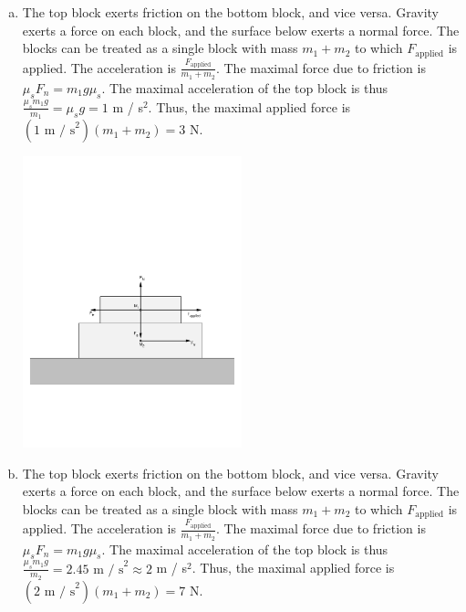 \documentclass{esg8012pset}
\begin{document}
\begin{solution}
  \begin{enumerate}[a)]
    \item The top block exerts friction on the bottom block, and vice versa.  Gravity exerts a force on each block, and the surface below exerts a normal force.  The blocks can be treated as a single block with mass $m_1 + m_2$ to which $F_{\text{applied}}$ is applied.  The acceleration is $\frac{F_{\text{applied}}}{m_1 + m_2}$.  The maximal force due to friction is $\mu_s F_n = m_1 g \mu_s$.  The maximal acceleration of the top block is thus $\frac{\mu_s m_1 g}{m_1} = \mu_s g = 1$ m / s$^2$.  Thus, the maximal applied force is $(1\text{ m / s}^2)(m_1 + m_2) = 3$ N.
      \par\begin{center}\includegraphics[width=0.5\textwidth]{2009-09-25_Diagram_2}\end{center}
    \item The top block exerts friction on the bottom block, and vice versa.  Gravity exerts a force on each block, and the surface below exerts a normal force.  The blocks can be treated as a single block with mass $m_1 + m_2$ to which $F_{\text{applied}}$ is applied.  The acceleration is $\frac{F_{\text{applied}}}{m_1 + m_2}$.  The maximal force due to friction is $\mu_s F_n = m_1 g \mu_s$.  The maximal acceleration of the top block is thus $\frac{\mu_s m_1 g}{m_2} = 2.45\text{ m / s}^2\approx 2$ m / s$^2$.  Thus, the maximal applied force is $(2\text{ m / s}^2)(m_1 + m_2) = 7$ N.

\end{enumerate}
\end{solution}
\end{document}
